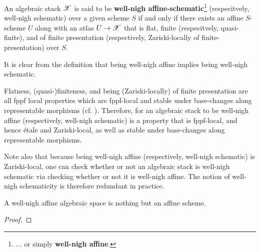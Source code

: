             \begin{definition} \label{def: well_nigh_affine_algebraic_stacks}
                \cite[\href{https://stacks.math.columbia.edu/tag/0DUL}{Tag 0DUL}]{stacks} An algebraic stack $\mathscr{X}$ is said to be \textbf{well-nigh affine-schematic}\footnote{... or simply \textbf{well-nigh affine}.} (respecitvely, well-nigh schematic) over a given scheme $S$ if and only if there exists an affine $S$-scheme $U$ along with an atlas $U \to \mathscr{X}$ that is flat, finite (respecitvely, quasi-finite), and of finite presentation (respectively, Zariski-locally of finite-presentation) over $S$. 
            \end{definition}
            \begin{remark}
                It is clear from the definition that being well-nigh affine implies being well-nigh schematic.
            \end{remark}
            \begin{remark} \label{remark: well_nigh_schematicity_is_fppf_local}
                Flatness, (quasi-)finiteness, and being (Zariski-locally) of finite presentation are all fppf local properties which are fppf-local and stable under base-changes along representable morphisms (cf. \cite[\href{https://stacks.math.columbia.edu/tag/02WE}{Tag 02WE}]{stacks}). Therefore, for an algebraic stack to be well-nigh affine (respectively, well-nigh schematic) is a property that is fppf-local, and hence \'etale and Zariski-local, as well as stable under base-changes along representable morphisms.
                
                Note also that because being well-nigh affine (respectively, well-nigh schematic) is Zariski-local, one can check whether or not an algebraic stack is well-nigh schematic via checking whether or not it is well-nigh affine. The notion of well-nigh schematicity is therefore redundant in practice.
            \end{remark}
            \begin{proposition} \label{prop: well_nigh_affine_algebraic_spaces}
                A well-nigh affine algebraic space is nothing but an affine scheme. 
            \end{proposition}
                \begin{proof}
                    
                \end{proof}
